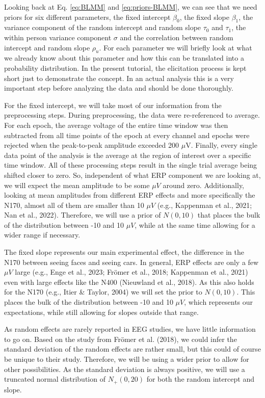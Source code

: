 \documentclass[
  doc,12pt,floatsintext]{apa7}
\begin{document}
Looking back at Eq. \eqref{eq:BLMM} and \eqref{eq:priors-BLMM}, we can see that we need priors for six different parameters, the fixed intercept \(\beta_0\), the fixed slope \(\beta_1\), the variance component of the random intercept and random slope \(\tau_0\) and \(\tau_1\), the within person variance component \(\sigma\) and the correlation between random intercept and random slope \(\rho_u\). For each parameter we will briefly look at what we already know about this parameter and how this can be translated into a probability distribution. In the present tutorial, the elicitation process is kept short just to demonstrate the concept. In an actual analysis this is a very important step before analyzing the data and should be done thoroughly.

For the fixed intercept, we will take most of our information from the preprocessing steps. During preprocessing, the data were re-referenced to average. For each epoch, the average voltage of the entire time window was then subtracted from all time points of the epoch at every channel and epochs were rejected when the peak-to-peak amplitude exceeded 200 \(\mu\)V. Finally, every single data point of the analysis is the average at the region of interest over a specific time window. All of these processing steps result in the single trial average being shifted closer to zero. So, independent of what ERP component we are looking at, we will expect the mean amplitude to be some \(\mu V\) around zero. Additionally, looking at mean amplitudes from different ERP effects and more specifically the N170, almost all of them are smaller than 10 \(\mu V\) (e.g., Kappenman et al., 2021; Nan et al., 2022). Therefore, we will use a prior of \(N(0, 10)\) that places the bulk of the distribution between -10 and 10 \(\mu V\), while at the same time allowing for a wider range if necessary.

The fixed slope represents our main experimental effect, the difference in the N170 between seeing faces and seeing cars. In general, ERP effects are only a few \(\mu V\) large (e.g., Enge et al., 2023; Frömer et al., 2018; Kappenman et al., 2021) even with large effects like the N400 (Nieuwland et al., 2018). As this also holds for the N170 (e.g., Itier \& Taylor, 2004) we will set the prior to \(N(0, 10)\). This places the bulk of the distribution between -10 and 10 \(\mu V\), which represents our expectations, while still allowing for slopes outside that range.

As random effects are rarely reported in EEG studies, we have little information to go on. Based on the study from Frömer et al. (2018), we could infer the standard deviation of the random effects are rather small, but this could of course be unique to their study. Therefore, we will be using a wider prior to allow for other possibilities. As the standard deviation is always positive, we will use a truncated normal distribution of \(N_+(0, 20)\) for both the random intercept and slope.
\end{document}
